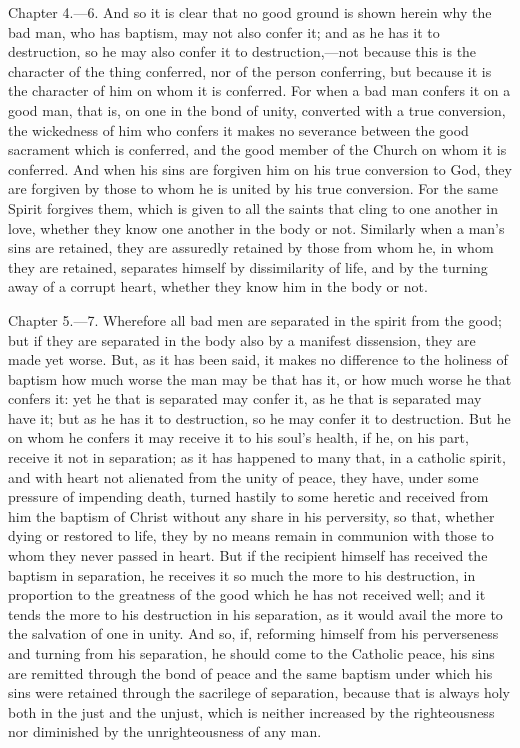 Chapter 4.—6. And so it is clear that no good ground is shown herein why the bad man, who has baptism, may not also confer it; and as he has it to destruction, so he may also confer it to destruction,—not because this is the character of the thing conferred, nor of the person conferring, but because it is the character of him on whom it is conferred. For when a bad man confers it on a good man, that is, on one in the bond of unity, converted with a true conversion, the wickedness of him who confers it makes no severance between the good sacrament which is conferred, and the good member of the Church on whom it is conferred. And when his sins are forgiven him on his true conversion to God, they are forgiven by those to whom he is united by his true conversion. For the same Spirit forgives them, which is given to all the saints that cling to one another in love, whether they know one another in the body or not. Similarly when a man’s sins are retained, they are assuredly retained by those from whom he, in whom they are retained, separates himself by dissimilarity of life, and by the turning away of a corrupt heart, whether they know him in the body or not.


Chapter 5.—7. Wherefore all bad men are separated in the spirit from the good; but if they are separated in the body also by a manifest dissension, they are made yet worse. But, as it has been said, it makes no difference to the holiness of baptism how much worse the man may be that has it, or how much worse he that confers it: yet he that is separated may confer it, as he that is separated may have it; but as he has it to destruction, so he may confer it to destruction. But he on whom he confers it may receive it to his soul’s health, if he, on his part, receive it not in separation; as it has happened to many that, in a catholic spirit, and with heart not alienated from the unity of peace, they have, under some pressure of impending death, turned hastily to some heretic and received from him the baptism of Christ without any share in his perversity, so that, whether dying or restored to life, they by no means remain in communion with those to whom they never passed in heart. But if the recipient himself has received the baptism in separation, he receives it so much the more to his destruction, in proportion to the greatness of the good which he has not received well; and it tends the more to his destruction in his separation, as it would avail the more to the salvation of one in unity. And so, if, reforming himself from his perverseness and turning from his separation, he should come to the Catholic peace, his sins are remitted through the bond of peace and the same baptism under which his sins were retained through the sacrilege of separation, because that is always holy both in the just and the unjust, which is neither increased by the righteousness nor diminished by the unrighteousness of any man.

